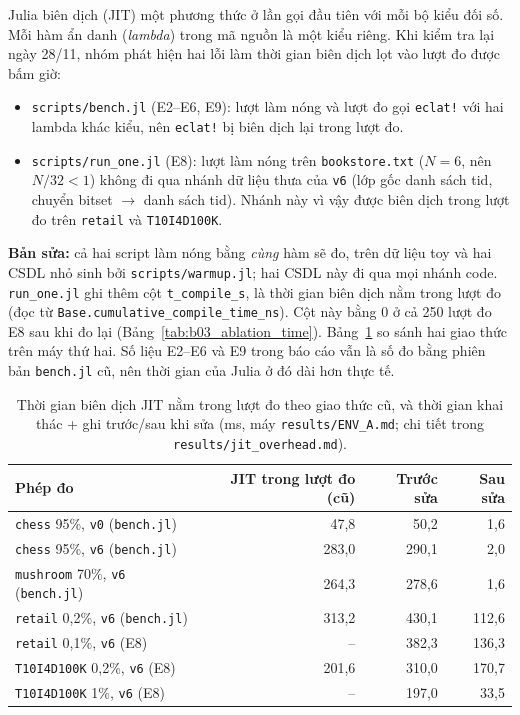 Julia biên dịch (JIT) một phương thức ở lần gọi đầu tiên với mỗi bộ kiểu đối số. Mỗi hàm ẩn danh (\emph{lambda}) trong mã nguồn là một kiểu riêng. Khi kiểm tra lại ngày 28/11, nhóm phát hiện hai lỗi làm thời gian biên dịch lọt vào lượt đo được bấm giờ:
\begin{itemize}
    \item \texttt{scripts/bench.jl} (E2--E6, E9): lượt làm nóng và lượt đo gọi \texttt{eclat!} với hai lambda khác kiểu, nên \texttt{eclat!} bị biên dịch lại trong lượt đo.
    \item \texttt{scripts/run\_one.jl} (E8): lượt làm nóng trên \texttt{bookstore.txt} ($N = 6$, nên $N/32 < 1$) không đi qua nhánh dữ liệu thưa của \texttt{v6} (lớp gốc danh sách tid, chuyển bitset $\to$ danh sách tid). Nhánh này vì vậy được biên dịch trong lượt đo trên \texttt{retail} và \texttt{T10I4D100K}.
\end{itemize}
\textbf{Bản sửa:} cả hai script làm nóng bằng \emph{cùng} hàm sẽ đo, trên dữ liệu toy và hai CSDL nhỏ sinh bởi \texttt{scripts/warmup.jl}; hai CSDL này đi qua mọi nhánh code. \texttt{run\_one.jl} ghi thêm cột \texttt{t\_compile\_s}, là thời gian biên dịch nằm trong lượt đo (đọc từ \texttt{Base.cumulative\_compile\_time\_ns}). Cột này bằng 0 ở cả 250 lượt đo E8 sau khi đo lại (Bảng~\ref{tab:b03_ablation_time}). Bảng~\ref{tab:jit_overhead} so sánh hai giao thức trên máy thứ hai. Số liệu E2--E6 và E9 trong báo cáo vẫn là số đo bằng phiên bản \texttt{bench.jl} cũ, nên thời gian của Julia ở đó dài hơn thực tế.

\begin{table}[!t]
\centering
\caption{Thời gian biên dịch JIT nằm trong lượt đo theo giao thức cũ, và thời gian khai thác + ghi trước/sau khi sửa (ms, máy \texttt{results/ENV\_A.md}; chi tiết trong \texttt{results/jit\_overhead.md}).}
\label{tab:jit_overhead}
\scriptsize
\begin{tabular}{@{}lrrr@{}}
\toprule
Phép đo & JIT trong lượt đo (cũ) & Trước sửa & Sau sửa \\
\midrule
\texttt{chess} 95\%, \texttt{v0} (\texttt{bench.jl}) & 47,8 & 50,2 & 1,6 \\
\texttt{chess} 95\%, \texttt{v6} (\texttt{bench.jl}) & 283,0 & 290,1 & 2,0 \\
\texttt{mushroom} 70\%, \texttt{v6} (\texttt{bench.jl}) & 264,3 & 278,6 & 1,6 \\
\texttt{retail} 0,2\%, \texttt{v6} (\texttt{bench.jl}) & 313,2 & 430,1 & 112,6 \\
\texttt{retail} 0,1\%, \texttt{v6} (E8) & -- & 382,3 & 136,3 \\
\texttt{T10I4D100K} 0,2\%, \texttt{v6} (E8) & 201,6 & 310,0 & 170,7 \\
\texttt{T10I4D100K} 1\%, \texttt{v6} (E8) & -- & 197,0 & 33,5 \\
\bottomrule
\end{tabular}
\end{table}

